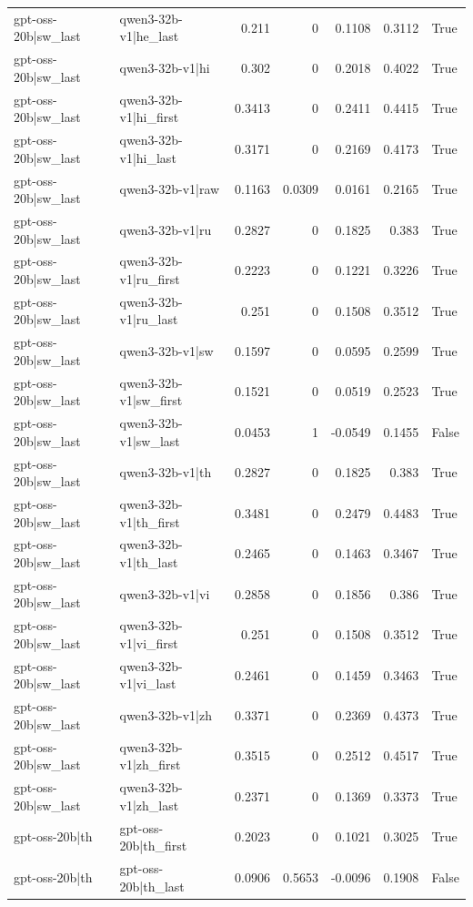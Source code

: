 \begin{table}
\begin{tabular}{l l r r r r l}
gpt-oss-20b|sw_last & qwen3-32b-v1|he_last & 0.211 & 0 & 0.1108 & 0.3112 & True \\
gpt-oss-20b|sw_last & qwen3-32b-v1|hi & 0.302 & 0 & 0.2018 & 0.4022 & True \\
gpt-oss-20b|sw_last & qwen3-32b-v1|hi_first & 0.3413 & 0 & 0.2411 & 0.4415 & True \\
gpt-oss-20b|sw_last & qwen3-32b-v1|hi_last & 0.3171 & 0 & 0.2169 & 0.4173 & True \\
gpt-oss-20b|sw_last & qwen3-32b-v1|raw & 0.1163 & 0.0309 & 0.0161 & 0.2165 & True \\
gpt-oss-20b|sw_last & qwen3-32b-v1|ru & 0.2827 & 0 & 0.1825 & 0.383 & True \\
gpt-oss-20b|sw_last & qwen3-32b-v1|ru_first & 0.2223 & 0 & 0.1221 & 0.3226 & True \\
gpt-oss-20b|sw_last & qwen3-32b-v1|ru_last & 0.251 & 0 & 0.1508 & 0.3512 & True \\
gpt-oss-20b|sw_last & qwen3-32b-v1|sw & 0.1597 & 0 & 0.0595 & 0.2599 & True \\
gpt-oss-20b|sw_last & qwen3-32b-v1|sw_first & 0.1521 & 0 & 0.0519 & 0.2523 & True \\
gpt-oss-20b|sw_last & qwen3-32b-v1|sw_last & 0.0453 & 1 & -0.0549 & 0.1455 & False \\
gpt-oss-20b|sw_last & qwen3-32b-v1|th & 0.2827 & 0 & 0.1825 & 0.383 & True \\
gpt-oss-20b|sw_last & qwen3-32b-v1|th_first & 0.3481 & 0 & 0.2479 & 0.4483 & True \\
gpt-oss-20b|sw_last & qwen3-32b-v1|th_last & 0.2465 & 0 & 0.1463 & 0.3467 & True \\
gpt-oss-20b|sw_last & qwen3-32b-v1|vi & 0.2858 & 0 & 0.1856 & 0.386 & True \\
gpt-oss-20b|sw_last & qwen3-32b-v1|vi_first & 0.251 & 0 & 0.1508 & 0.3512 & True \\
gpt-oss-20b|sw_last & qwen3-32b-v1|vi_last & 0.2461 & 0 & 0.1459 & 0.3463 & True \\
gpt-oss-20b|sw_last & qwen3-32b-v1|zh & 0.3371 & 0 & 0.2369 & 0.4373 & True \\
gpt-oss-20b|sw_last & qwen3-32b-v1|zh_first & 0.3515 & 0 & 0.2512 & 0.4517 & True \\
gpt-oss-20b|sw_last & qwen3-32b-v1|zh_last & 0.2371 & 0 & 0.1369 & 0.3373 & True \\
gpt-oss-20b|th & gpt-oss-20b|th_first & 0.2023 & 0 & 0.1021 & 0.3025 & True \\
gpt-oss-20b|th & gpt-oss-20b|th_last & 0.0906 & 0.5653 & -0.0096 & 0.1908 & False \\

\end{tabular}
\end{table}
